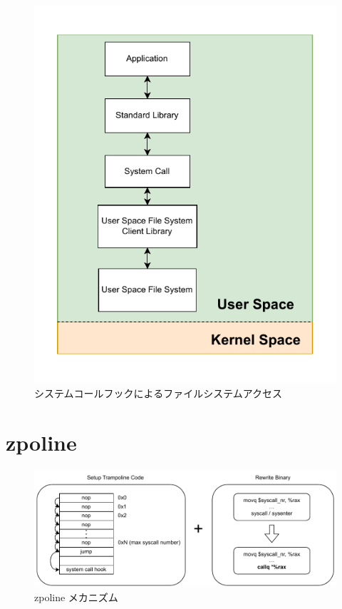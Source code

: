 \documentclass[a4paper,11pt]{jreport}
\begin{document}
\begin{figure}[h]
	\begin{minipage}[b]{1\columnwidth}
		\centering
		\includegraphics[width=0.9\linewidth]{./figure/syscall_hook.pdf}
		\caption{システムコールフックによるファイルシステムアクセス}
		\label{fig:Syscall hook}
	\end{minipage}
\end{figure}

\section{zpoline}

\begin{figure}[h]
	\begin{minipage}[b]{1\columnwidth}
		\centering
		\includegraphics[width=0.9\linewidth]{./figure/zpoline_mechanism.pdf}
		\caption{zpoline メカニズム}
		\label{fig:Zpoline mechanism}
	\end{minipage}
\end{figure}
\end{document}
